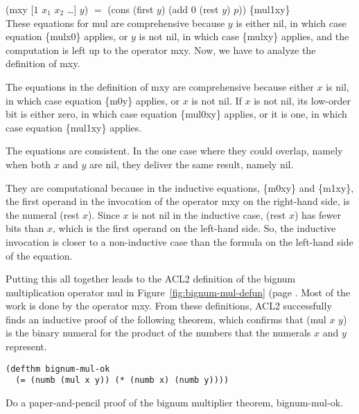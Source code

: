 \hspace*{2cm} \textsf{(mxy [$1$ $x_1$ $x_2$ \dots] $y$)} $=$ \textsf{(cons (first $y$) (add 0 (rest $y$) $p$))} \hfill \{mul1xy\}
\\

These equations for \textsf{mul} are comprehensive because $y$ is either \textsf{nil},
in which case equation \{mulx0\} applies,
or $y$ is not \textsf{nil}, in which case \{mulxy\} applies, and
the computation is left up to the operator \textsf{mxy}.
Now, we have to analyze the definition of \textsf{mxy}.

The equations in the definition of \textsf{mxy} are comprehensive
because either $x$ is \textsf{nil}, in which case
equation \{m0y\} applies, or $x$ is not \textsf{nil}.
If $x$ is not \textsf{nil}, its low-order bit is either zero,
in which case equation \{mul0xy\} applies, or it is one,
in which case equation \{mul1xy\} applies.

The equations are consistent. In the one case
where they could overlap, namely when both $x$ and $y$
are \textsf{nil}, they deliver the same result, namely \textsf{nil}.

They are computational because in the inductive equations,
\{m0xy\} and \{m1xy\}, the first operand in
the invocation of the operator \textsf{mxy} on the right-hand side,
is the numeral \textsf{(rest $x$)}.
Since $x$ is not \textsf{nil} in the inductive case,
\textsf{(rest $x$)} has fewer bits than $x$, which is the first operand
on the left-hand side.
So, the inductive invocation is closer to a non-inductive
case than the formula on the left-hand side of the equation.

Putting this all together leads to the ACL2 definition
of the bignum multiplication operator \textsf{mul} in
Figure~\ref{fig:bignum-mul-defun} (page \pageref{fig:bignum-mul-defun}.
Most of the work is done by the operator \textsf{mxy}.
From these definitions, ACL2 successfully finds an
inductive proof of the following theorem,
which confirms that \textsf{(mul $x$ $y$)} is the binary numeral
for the product of the numbers that the numerals $x$ and $y$ represent.

\label{bignum-mul-thm}
\begin{Verbatim}
(defthm bignum-mul-ok
  (= (numb (mul x y)) (* (numb x) (numb y))))
\end{Verbatim}

\begin{ExerciseList}
\Exercise
Do a paper-and-pencil proof of
the bignum multiplier theorem, \textsf{bignum-mul-ok}.
\end{ExerciseList}


